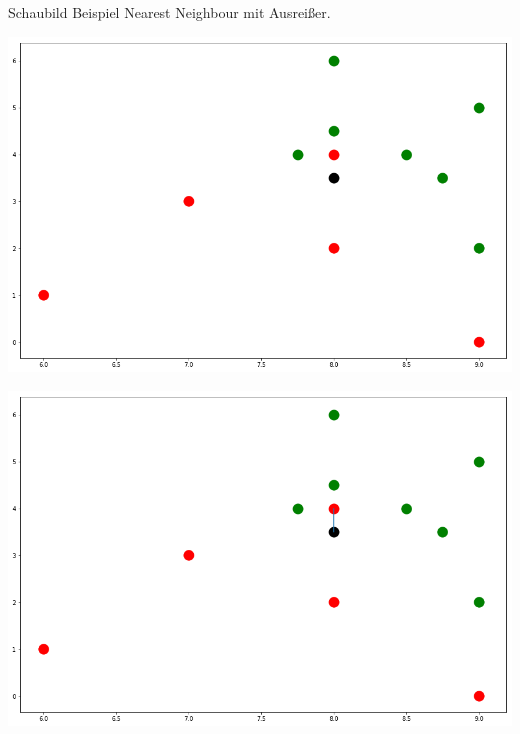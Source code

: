 \documentclass[fontsize=11pt]{scrartcl}
\newenvironment{Figure}
  {\par\medskip\noindent\minipage{\linewidth}}
  {\endminipage\par\medskip}
\begin{document}
                Schaubild Beispiel Nearest Neighbour mit Ausreißer.
                \begin{Figure}
                    \begin{minipage}[b]{.4\linewidth}
                        \includegraphics[scale=0.2]{errnn1.png}
                    \end{minipage}
                    \hspace{.1\linewidth}
                    \begin{minipage}[b]{.4\linewidth}
                        \includegraphics[scale=0.2]{errnn2.png}
                    \end{minipage}
                    \hspace{.1\linewidth}
                    \begin{minipage}[b]{.4\linewidth}

\end{minipage}
\end{Figure}
\end{document}
